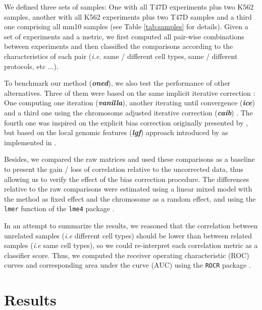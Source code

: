 \documentclass{bioinfo}
\begin{document}
\begin{methods}
We defined three sets of samples: One with all T47D experiments plus two K562 samples, another with all K562 experiments plus two T47D samples and a third one comprising all mm10 samples (see Table \ref{tab:samples} for details). Given a set of experiments and a metric, we first computed all pair-wise combinations between experiments and then classified the comparisons according to the characteristics of each pair (\textit{i.e.} same / different cell types, same / different protocols, etc ...). 

To benchmark our method (\textbf{\textit{oned}}), we also test the performance of other alternatives. Three of them were based on the same implicit iterative correction \citep{imakaev2012iterative}: One computing one iteration (\textbf{\textit{vanilla}}), another iterating until convergence (\textbf{\textit{ice}}) and a third one using the chromosome adjusted iterative correction (\textbf{\textit{caib}}) \citep{wu2016computational}. The fourth one was inspired on the explicit bias correction originally presented by \cite{yaffe2011probabilistic}, but based on the local genomic features (\textbf{\textit{lgf}}) approach introduced by \cite{hu2012hicnorm} as implemented in \cite{servant2012hitc}.

Besides, we compared the raw matrices and used these comparisons as a baseline to present the gain / loss of correlation relative to the uncorrected data, thus allowing us to verify the effect of the bias correction procedure. The differences relative to the raw comparisons were estimated using a linear mixed model with the method as fixed effect and the chromosome as a random effect, and using the \texttt{lmer} function of the \texttt{lme4} package \citep{bates2015lme4}.

In an attempt to summarize the results, we reasoned that the correlation between unrelated samples (\textit{i.e} different cell types) should be lower than between related samples (\textit{i.e} same cell types), so we could re-interpret each correlation metric as a classifier score. Thus, we computed the receiver operating characteristic (ROC) curves and corresponding area under the curve (AUC) using the \texttt{ROCR} package \citep{sing2005rocr}.

\end{methods}

\section{Results}
\end{document}
